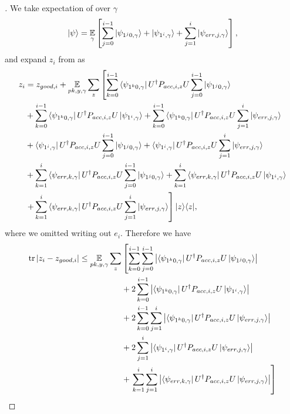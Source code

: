 \begin{proof}[]
	We take expectation of  over $\gamma$
	$$\ket{\psi}=\operatorname*{\mathbb{E}}_{\gamma}\left[
		\sum_{j=0}^{i-1} \ket{\psi_{1^j0,\gamma}} +\ket{\psi_{1^i,\gamma}} +\sum_{j=1}^{i}\ket{\psi_{err,j,\gamma}}
	\right],$$
	and expand $z_i$ from  as
	\begin{align}
		z_i &= z_{good,i}+ \operatorname*{\mathbb{E}}_{pk, y, \gamma} \sum_z \left[\sum_{k=0}^{i-1} \bra{\psi_{1^k0,\gamma}}U^\dag  P_{acc,i,z}U   \sum_{j=0}^{i-1} \ket{\psi_{1^j0,\gamma}} \right. \nonumber \\
		&+
		\sum_{k=0}^{i-1} \bra{\psi_{1^k0,\gamma}}U^\dag  P_{acc,i,z}U \ket{\psi_{1^i,\gamma}} +\sum_{k=0}^{i-1} \bra{\psi_{1^k0,\gamma}}U^\dag  P_{acc,i,z}U\sum_{j=1}^{i}\ket{\psi_{err,j,\gamma}} \nonumber \\
		&+\bra{\psi_{1^i,\gamma}} U^\dag  P_{acc,i,z}U \sum_{j=0}^{i-1} \ket{\psi_{1^j0,\gamma}} +\bra{\psi_{1^i,\gamma}} U^\dag  P_{acc,i,z}U \sum_{j=1}^{i}\ket{\psi_{err,j,\gamma}}
		\nonumber \\
		&+ \sum_{k=1}^{i}\bra{\psi_{err,k,\gamma}} U^\dag  P_{acc,i,z}U  \sum_{j=0}^{i-1} \ket{\psi_{1^j0,\gamma}} + \sum_{k=1}^{i}\bra{\psi_{err,k,\gamma}} U^\dag  P_{acc,i,z}U \ket{\psi_{1^i,\gamma}}
		\nonumber \\
		&\left.    +\sum_{k=1}^{i}\bra{\psi_{err,k,\gamma}} U^\dag  P_{acc,i,z}U \sum_{j=1}^{i}\ket{\psi_{err,j,\gamma}} \right] |z\rangle\langle z| , \nonumber     
	\end{align}
	where we omitted writing out $e_i$.
	Therefore we have
	\begin{align*}
		\tr|z_i-z_{good,i}|\leq \E_{pk, y, \gamma} \sum_z &\L[ \sum_{k=0}^{i-1} \sum_{j=0}^{i-1} \L| \bra{\psi_{1^k0,\gamma}}U^\dag  P_{acc,i,z}U \ket{\psi_{1^j0,\gamma}} \R|\R.\\
		&+
		2 \sum_{k=0}^{i-1} \L|\bra{\psi_{1^k0,\gamma}}U^\dag  P_{acc,i,z}U \ket{\psi_{1^i,\gamma}} \R| \\
		&+ 2 \sum_{k=0}^{i-1}\sum_{j=1}^{i}\L| \bra{\psi_{1^k0,\gamma}}U^\dag  P_{acc,i,z}U\ket{\psi_{err,j,\gamma}}\R| \\   
		&+2 \sum_{j=1}^{i}\L|\bra{\psi_{1^i,\gamma}} U^\dag  P_{acc,i,z}U \ket{\psi_{err,j,\gamma}}\R| \\
		&+\L. \sum_{k=1}^{i}\sum_{j=1}^{i}\L| \bra{\psi_{err,k,\gamma}} U^\dag  P_{acc,i,z}U \ket{\psi_{err,j,\gamma}}\R| \R] \\ %
	\end{align*}

\end{proof}
